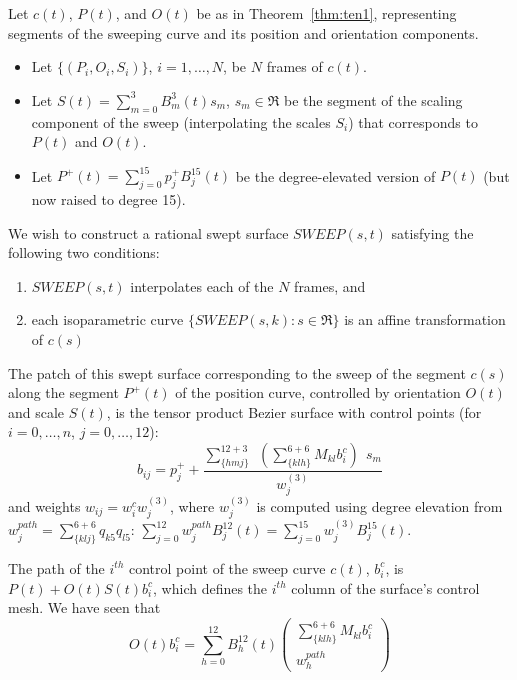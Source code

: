 \begin{theorem}
\label{thm:ten2}
Let $c(t)$, $P(t)$, and $O(t)$ be as in Theorem~\ref{thm:ten1},
representing segments of the sweeping curve and its position and orientation components.
\begin{itemize}
\item
Let $\{(P_i,O_i,S_i)\}$, $i=1,\ldots,N$, be $N$ frames of $c(t)$.
\item
Let $S(t) = \sum_{m=0}^{3} B_m^3(t) s_m$, $s_m \in \Re$
be the segment of the scaling component of the sweep (interpolating the scales
$S_i$) that corresponds to $P(t)$ and $O(t)$.
\item
Let $P^{+}(t) = \sum_{j=0}^{15} p_j^{+} B_j^{15}(t)$
be the degree-elevated version of $P(t)$ (but now raised to degree 15).
\end{itemize}

We wish to construct a rational swept surface $SWEEP(s,t)$ satisfying 
the following two conditions:
\begin{enumerate}
\item $SWEEP(s,t)$ interpolates each of the $N$ frames, and
\item  each isoparametric curve $\{SWEEP(s,k) : s \in \Re \}$
	is an affine transformation of $c(s)$
\end{enumerate}
The patch of this swept surface corresponding to the sweep of the segment
$c(s)$ along the segment $P^{+}(t)$ of the position curve, controlled 
by orientation $O(t)$ and scale $S(t)$, 
is the tensor product Bezier surface with control points
(for $i=0,\ldots,n$, $j=0,\ldots,12$):
\[
b_{ij} = p_j^{+} + \frac{\sum_{\{hmj\}}^{12+3} \ \ 
		(\sum_{\{klh\}}^{6+6} M_{kl} b_i^c) \ \ s_m}{w^{(3)}_j}
\]
and weights $w_{ij} = w_i^c  w^{(3)}_j$,
where $w^{(3)}_j$ is computed using degree elevation from 
$w_j^{path} = \sum_{\{klj\}}^{6+6} q_{k5} q_{l5}$:
$\sum_{j=0}^{12} w_j^{path} B_j^{12}(t) = 
   \sum_{j=0}^{15} w_j^{(3)}  B_j^{15}(t)$.
\end{theorem}
\prf
The path of the $i^{th}$ control point of the sweep curve $c(t)$,
$b_i^c$, is $P(t) + O(t)S(t)b_i^c$,
which defines the $i^{th}$ column of the surface's control mesh.
We have seen that 
\[
O(t) b_i^c = 	\sum_{h=0}^{12} B_h^{12}(t) 
	\left(	\begin{array}{c}
	\sum_{\{klh\}}^{6+6} M_{kl} b_i^c \\ w_h^{path}
	\end{array} \right)
\]
